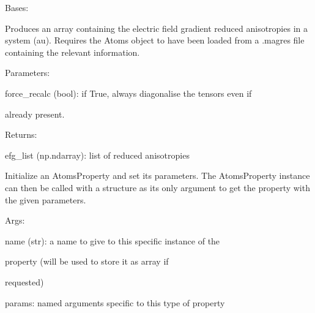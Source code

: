 \documentclass[letterpaper,10pt,english]{sphinxmanual}
\begin{document}
\begin{fulllineitems}
\label{doctree/soprano.properties.nmr.efg:soprano.properties.nmr.efg.EFGReducedAnisotropy}
Bases: {\hyperref[doctree/soprano.properties.atomsproperty:soprano.properties.atomsproperty.AtomsProperty]{}}

Produces an array containing the electric field gradient reduced
anisotropies in a system (au).
Requires the Atoms object to have been loaded from a .magres file
containing the relevant information.

\begin{DUlineblock}{0em}
\item[] Parameters:
\item[]
\begin{DUlineblock}{\DUlineblockindent}
\item[] force\_recalc (bool): if True, always diagonalise the tensors even if
\item[]
\begin{DUlineblock}{\DUlineblockindent}
\item[] already present.
\end{DUlineblock}
\end{DUlineblock}
\end{DUlineblock}

\begin{DUlineblock}{0em}
\item[] Returns:
\item[]
\begin{DUlineblock}{\DUlineblockindent}
\item[] efg\_list (np.ndarray): list of reduced anisotropies
\end{DUlineblock}
\end{DUlineblock}

Initialize an AtomsProperty and set its parameters.
The AtomsProperty instance can then be called with a structure as its
only argument to get the property with the given parameters.

\begin{DUlineblock}{0em}
\item[] Args:
\item[]
\begin{DUlineblock}{\DUlineblockindent}
\item[] name (str): a name to give to this specific instance of the
\item[]
\begin{DUlineblock}{\DUlineblockindent}
\item[] property (will be used to store it as array if
\item[] requested)
\end{DUlineblock}
\item[] params: named arguments specific to this type of property
\end{DUlineblock}
\end{DUlineblock}


\end{fulllineitems}
\end{document}
